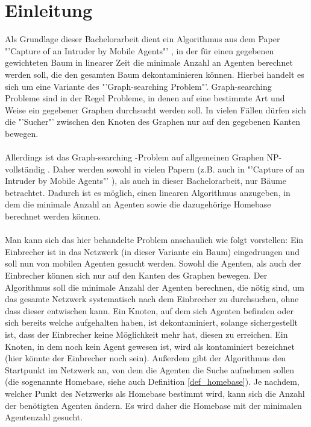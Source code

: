 \section{Einleitung}

Als Grundlage dieser Bachelorarbeit dient ein Algorithmus aus dem Paper "'Capture of an Intruder by Mobile Agents"' \cite{cima_paper}, in der für einen gegebenen gewichteten Baum in linearer Zeit die minimale Anzahl an Agenten berechnet werden soll, die den gesamten Baum dekontaminieren können. Hierbei handelt es sich um eine Variante des "'Graph-searching Problem"'. Graph-searching Probleme sind in der Regel Probleme, in denen auf eine bestimmte Art und Weise ein gegebener Graphen durchsucht werden soll. In vielen Fällen dürfen sich die "'Sucher"' zwischen den Knoten des Graphen nur auf den gegebenen Kanten bewegen.
\\
\\
Allerdings ist das Graph-searching -Problem auf allgemeinen Graphen NP-vollständig \cite{complexity_paper}. Daher werden sowohl in vielen Papern (z.B. auch in "'Capture of an Intruder by Mobile Agents"' \cite{cima_paper}), als auch in dieser Bachelorarbeit, nur Bäume betrachtet. Dadurch ist es möglich, einen linearen Algorithmus anzugeben, in dem die minimale Anzahl an Agenten sowie die dazugehörige Homebase berechnet werden können.
\\
\\
Man kann sich das hier behandelte Problem anschaulich wie folgt vorstellen: Ein Einbrecher ist in das Netzwerk (in dieser Variante ein Baum) eingedrungen und soll nun von mobilen Agenten gesucht werden. Sowohl die Agenten, als auch der Einbrecher können sich nur auf den Kanten des Graphen bewegen. Der Algorithmus soll die minimale Anzahl der Agenten berechnen, die nötig sind, um das gesamte Netzwerk systematisch nach dem Einbrecher zu durchsuchen, ohne dass dieser entwischen kann. Ein Knoten, auf dem sich Agenten befinden oder sich bereits welche aufgehalten haben, ist dekontaminiert, solange sichergestellt ist, dass der Einbrecher keine Möglichkeit mehr hat, diesen zu erreichen. Ein Knoten, in dem noch kein Agent gewesen ist, wird als kontaminiert bezeichnet (hier könnte der Einbrecher noch sein). Außerdem gibt der Algorithmus den Startpunkt im Netzwerk an, von dem die Agenten die Suche aufnehmen sollen (die sogenannte Homebase, siehe auch Definition \ref{def_homebase}). Je nachdem, welcher Punkt des Netzwerks als Homebase bestimmt wird, kann sich die Anzahl der benötigten Agenten ändern. Es wird daher die Homebase mit der minimalen Agentenzahl gesucht.
